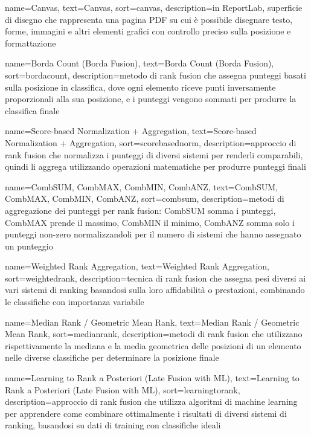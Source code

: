 {
    name=Canvas,
    text=Canvas,
    sort=canvas,
    description={in ReportLab, superficie di disegno che rappresenta una pagina PDF su cui è possibile disegnare testo, forme, immagini e altri elementi grafici con controllo preciso sulla posizione e formattazione}
}

 {
    name=Borda Count (Borda Fusion),
    text=Borda Count (Borda Fusion),
    sort=bordacount,
    description={metodo di rank fusion che assegna punteggi basati sulla posizione in classifica, dove ogni elemento riceve punti inversamente proporzionali alla sua posizione, e i punteggi vengono sommati per produrre la classifica finale}
}

 {
    name=Score-based Normalization + Aggregation,
    text=Score-based Normalization + Aggregation,
    sort=scorebasednorm,
    description={approccio di rank fusion che normalizza i punteggi di diversi sistemi per renderli comparabili, quindi li aggrega utilizzando operazioni matematiche per produrre punteggi finali}
}

 {
    name=CombSUM, CombMAX, CombMIN, CombANZ,
    text=CombSUM, CombMAX, CombMIN, CombANZ,
    sort=combsum,
    description={metodi di aggregazione dei punteggi per rank fusion: CombSUM somma i punteggi, CombMAX prende il massimo, CombMIN il minimo, CombANZ somma solo i punteggi non-zero normalizzandoli per il numero di sistemi che hanno assegnato un punteggio}
}

 {
    name=Weighted Rank Aggregation,
    text=Weighted Rank Aggregation,
    sort=weightedrank,
    description={tecnica di rank fusion che assegna pesi diversi ai vari sistemi di ranking basandosi sulla loro affidabilità o prestazioni, combinando le classifiche con importanza variabile}
}

 {
    name=Median Rank / Geometric Mean Rank,
    text=Median Rank / Geometric Mean Rank,
    sort=medianrank,
    description={metodi di rank fusion che utilizzano rispettivamente la mediana e la media geometrica delle posizioni di un elemento nelle diverse classifiche per determinare la posizione finale}
}

 {
    name=Learning to Rank a Posteriori (Late Fusion with ML),
    text=Learning to Rank a Posteriori (Late Fusion with ML),
    sort=learningtorank,
    description={approccio di rank fusion che utilizza algoritmi di machine learning per apprendere come combinare ottimalmente i risultati di diversi sistemi di ranking, basandosi su dati di training con classifiche ideali}
}


